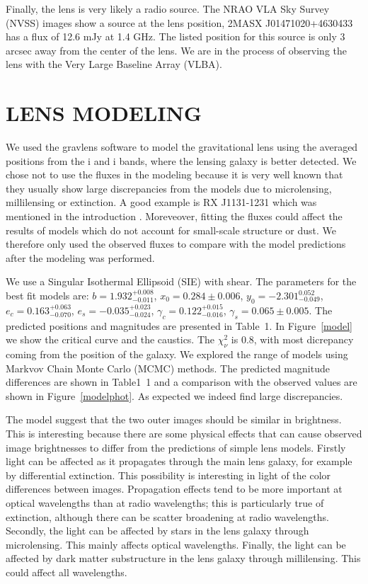 \documentclass[manuscript]{aastex}
\begin{document}
Finally, the lens is very likely a radio source. The NRAO VLA Sky Survey (NVSS) images show a source at the lens position, 2MASX J01471020+4630433 has a flux of 12.6 mJy at 1.4 GHz. The listed position for this source is only 3 arcsec away from the center of the lens. We are in the process of observing the lens with the Very Large Baseline Array (VLBA).


\section{LENS MODELING}


We used the gravlens software to model the gravitational lens \citep{kee01} using the averaged positions from the i and i bands, where the lensing galaxy is better detected. We chose not to use the fluxes in the modeling because it is very well known that they usually show large discrepancies from the models due to microlensing, millilensing or extinction. A good example is RX J1131-1231 which was mentioned in the introduction \citep{slu08}. Moreveover, fitting the fluxes could affect the results of models which do not account for small-scale structure or dust.  We therefore only used the observed fluxes to compare with the model predictions after the modeling was performed.

We use a Singular Isothermal Ellipsoid (SIE) with shear. The parameters for the best fit models are: $b = 1.932_{-0.011}^{+0.008}$, $x_0 = 0.284\pm0.006$, $y_0 = -2.301_{-0.049}^{0.052}$, $e_c = 0.163_{-0.070}^{+0.063}$, $e_s = -0.035_{-0.024}^{+0.023}$, $\gamma_c = 0.122_{-0.016}^{+0.015}$, $\gamma_s = 0.065\pm0.005$. The predicted positions and magnitudes are presented in Table~1. In Figure~\ref{model} we show the critical curve and the caustics. The $\chi^2_{\nu}$ is 0.8, with most dicrepancy coming from the position of the galaxy. We explored the range of models using Markvov Chain Monte Carlo (MCMC) methods. The predicted magnitude differences are shown in Table1~1 and a comparison with the observed values are shown in Figure~\ref{modelphot}. As expected we indeed find large discrepancies. 

 The model suggest that the two outer images should be similar in brightness.  This is interesting because there are some physical effects that can cause observed image brightnesses to differ from the predictions of simple lens models. Firstly light can be affected as it propagates through the main lens galaxy, for example by differential extinction.  This possibility is interesting in light of the color differences between images.  Propagation effects tend to be more important at optical wavelengths than at radio wavelengths; this is particularly true of extinction, although there can be scatter broadening at radio wavelengths. Secondly, the light can be affected by stars in the lens galaxy through microlensing.  This mainly affects optical wavelengths. Finally, the light can be affected by dark matter substructure in the lens galaxy through millilensing.  This could affect all wavelengths.
\end{document}
